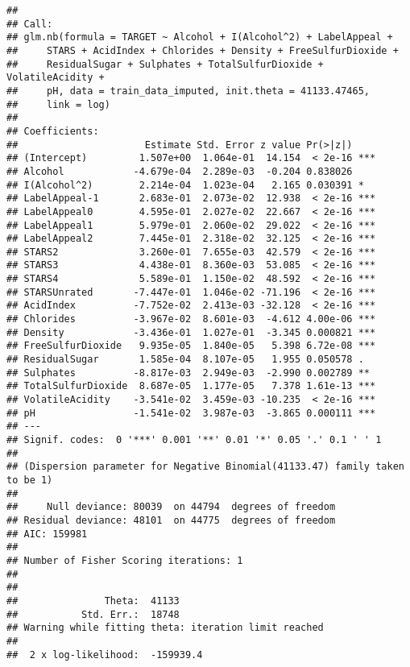 \documentclass[
]{article}
\begin{document}
\begin{verbatim}
## 
## Call:
## glm.nb(formula = TARGET ~ Alcohol + I(Alcohol^2) + LabelAppeal + 
##     STARS + AcidIndex + Chlorides + Density + FreeSulfurDioxide + 
##     ResidualSugar + Sulphates + TotalSulfurDioxide + VolatileAcidity + 
##     pH, data = train_data_imputed, init.theta = 41133.47465, 
##     link = log)
## 
## Coefficients:
##                      Estimate Std. Error z value Pr(>|z|)    
## (Intercept)         1.507e+00  1.064e-01  14.154  < 2e-16 ***
## Alcohol            -4.679e-04  2.289e-03  -0.204 0.838026    
## I(Alcohol^2)        2.214e-04  1.023e-04   2.165 0.030391 *  
## LabelAppeal-1       2.683e-01  2.073e-02  12.938  < 2e-16 ***
## LabelAppeal0        4.595e-01  2.027e-02  22.667  < 2e-16 ***
## LabelAppeal1        5.979e-01  2.060e-02  29.022  < 2e-16 ***
## LabelAppeal2        7.445e-01  2.318e-02  32.125  < 2e-16 ***
## STARS2              3.260e-01  7.655e-03  42.579  < 2e-16 ***
## STARS3              4.438e-01  8.360e-03  53.085  < 2e-16 ***
## STARS4              5.589e-01  1.150e-02  48.592  < 2e-16 ***
## STARSUnrated       -7.447e-01  1.046e-02 -71.196  < 2e-16 ***
## AcidIndex          -7.752e-02  2.413e-03 -32.128  < 2e-16 ***
## Chlorides          -3.967e-02  8.601e-03  -4.612 4.00e-06 ***
## Density            -3.436e-01  1.027e-01  -3.345 0.000821 ***
## FreeSulfurDioxide   9.935e-05  1.840e-05   5.398 6.72e-08 ***
## ResidualSugar       1.585e-04  8.107e-05   1.955 0.050578 .  
## Sulphates          -8.817e-03  2.949e-03  -2.990 0.002789 ** 
## TotalSulfurDioxide  8.687e-05  1.177e-05   7.378 1.61e-13 ***
## VolatileAcidity    -3.541e-02  3.459e-03 -10.235  < 2e-16 ***
## pH                 -1.541e-02  3.987e-03  -3.865 0.000111 ***
## ---
## Signif. codes:  0 '***' 0.001 '**' 0.01 '*' 0.05 '.' 0.1 ' ' 1
## 
## (Dispersion parameter for Negative Binomial(41133.47) family taken to be 1)
## 
##     Null deviance: 80039  on 44794  degrees of freedom
## Residual deviance: 48101  on 44775  degrees of freedom
## AIC: 159981
## 
## Number of Fisher Scoring iterations: 1
## 
## 
##               Theta:  41133 
##           Std. Err.:  18748 
## Warning while fitting theta: iteration limit reached 
## 
##  2 x log-likelihood:  -159939.4
\end{verbatim}
\end{document}

